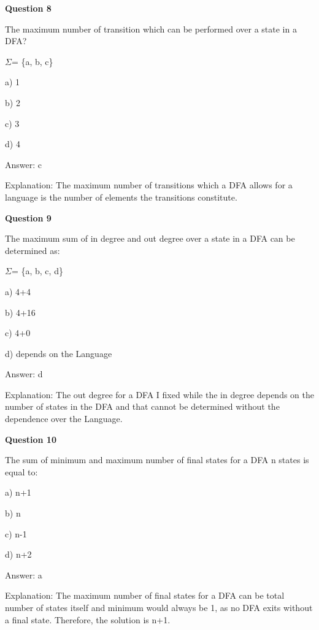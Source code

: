 \documentclass{article}
\begin{document}
\begin{mdframed}[linewidth=1pt, roundcorner=5pt, linecolor=gray!30, backgroundcolor=gray!5]
\textbf{Question 8} 

The maximum number of transition which can be performed over a state in a DFA?

$\Sigma$= \{a, b, c\}

a) 1

b) 2

c) 3

d) 4
\vspace{5pt} \par
\begin{tcolorbox}[colback=green!5, colframe=green!40!black, title=Solution]
Answer: c

Explanation: The maximum number of transitions which a DFA allows for a language is the number of elements the transitions constitute.
\end{tcolorbox}
\end{mdframed}
\newpage

\begin{mdframed}[linewidth=1pt, roundcorner=5pt, linecolor=gray!30, backgroundcolor=gray!5]
\textbf{Question 9} 

The maximum sum of in degree and out degree over a state in a DFA can be determined as:

$\Sigma$= \{a, b, c, d\}

a) 4+4

b) 4+16

c) 4+0

d) depends on the Language
\vspace{5pt} \par
\begin{tcolorbox}[colback=green!5, colframe=green!40!black, title=Solution]
Answer: d

Explanation: The out degree for a DFA I fixed while the in degree depends on the number of states in the DFA and that cannot be determined without the dependence over the Language.
\end{tcolorbox}
\end{mdframed}

\begin{mdframed}[linewidth=1pt, roundcorner=5pt, linecolor=gray!30, backgroundcolor=gray!5]
\textbf{Question 10} 

The sum of minimum and maximum number of final states for a DFA n states is equal to:

a) n+1

b) n

c) n-1

d) n+2
\vspace{5pt} \par
\begin{tcolorbox}[colback=green!5, colframe=green!40!black, title=Solution]
Answer: a

Explanation: The maximum number of final states for a DFA can be total number of states itself and minimum would always be 1, as no DFA exits without a final state. Therefore, the solution is n+1.
\end{tcolorbox}
\end{mdframed}
\newpage
\end{document}
